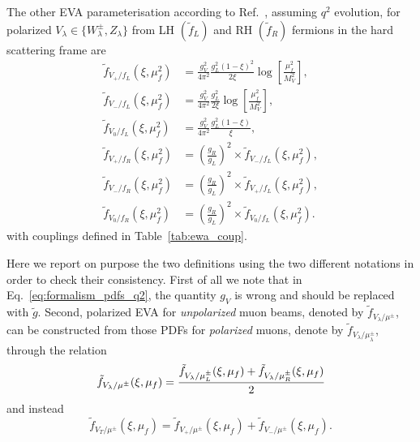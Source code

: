 \documentclass[a4paper,11pt]{article}
\begin{document}
The other EVA parameterisation  according to Ref.~\cite{Ruiz:2021tdt}, assuming $q^2$ evolution,
 for polarized $V_\lambda\in\{W_\lambda^\pm,Z_\lambda\}$ from LH $(\tilde{f}_L)$ and RH $(\tilde{f}_R)$ fermions in the hard scattering frame are 
\begin{subequations}
\label{eq:formalism_pdfs_q2}
\begin{align}
\tilde{f}_{V_+/f_L}(\xi,\mu_f^2) 	&= \frac{g_V^2}{4\pi^2} \frac{g_L^2(1-\xi)^2}{2\xi} \log \left[\frac{\mu_f^2}{M_V^2}\right], \\
\tilde{f}_{V_-/f_L}(\xi,\mu_f^2) 	&= \frac{g_V^2}{4\pi^2} \frac{g_L^2}{2\xi} \log \left[\frac{\mu_f^2}{M_V^2}\right], \\
\tilde{f}_{V_0 / f_L}(\xi,\mu_f^2) 	&= \frac{g_V^2}{4\pi^2} \frac{g_L^2(1-\xi)}{\xi},\\  
\tilde{f}_{V_+/f_R}(\xi,\mu_f^2) 	&= \left(\frac{g_R}{g_L}\right)^2 \times \tilde{f}_{V_-/f_L}(\xi,\mu_f^2), \\
\tilde{f}_{V_-/f_R}(\xi,\mu_f^2) 	&= \left(\frac{g_R}{g_L}\right)^2 \times \tilde{f}_{V_+/f_L}(\xi,\mu_f^2), \\
\tilde{f}_{V_0/f_R}(\xi,\mu_f^2) 	&= \left(\frac{g_R}{g_L}\right)^2 \times \tilde{f}_{V_0/f_L}(\xi,\mu_f^2). 
\end{align}
\end{subequations}
%
with couplings defined in Table~\ref{tab:ewa_coup}.

Here we report on purpose the two definitions using the two different notations in order to check their consistency.
First of all we note that in Eq.~\eqref{eq:formalism_pdfs_q2}, the quantity $g_V$ is wrong and should be replaced with $\tilde{g}$. Second,
polarized EVA for \textit{unpolarized} muon beams, denoted by $\tilde{f}_{V_\lambda/\mu^\pm}$, can be constructed from those PDFs for \textit{polarized} muons, denote by $\tilde{f}_{V_\lambda/\mu^\pm_\lambda}$, through the relation
\begin{equation}
 \tilde{f}_{V_\lambda/\mu^\pm}(\xi,\mu_f) =
 \cfrac{\tilde{f}_{V_\lambda/\mu^\pm_L}(\xi,\mu_f) + \tilde{f}_{V_\lambda/\mu^\pm_R}(\xi,\mu_f)}{2}
\label{eq:pdfDef_unpolarizedMuon}
\end{equation}
%
and instead 
%
\begin{equation}
 \tilde{f}_{V_T/\mu^\pm}(\xi,\mu_f) =
\tilde{f}_{V_+/\mu^\pm}(\xi,\mu_f) + \tilde{f}_{V_-/\mu^\pm}(\xi,\mu_f).
\label{eq:pdfDef_unpolarizedMuon}
\end{equation}
\end{document}
